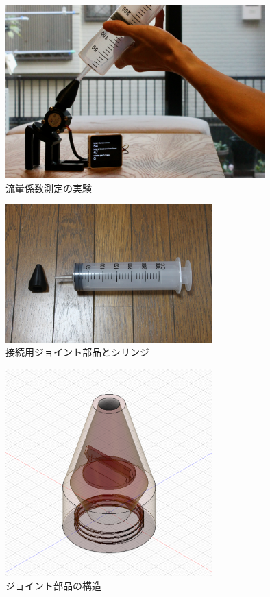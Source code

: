 \begin{figure}[H]
  \begin{center}
    \includegraphics[width=10cm]{fig/flowsensor_calibrate}
    \caption{流量係数測定の実験}
    \label{fig:flowsensor_calibrate}
  \end{center}
\end{figure}

\begin{figure}[H]
  \begin{center}
    \includegraphics[width=8cm]{fig/syringe}
    \caption{接続用ジョイント部品とシリンジ}
    \label{fig:syringe}
  \end{center}
\end{figure}

\begin{figure}[H]
  \begin{center}
    \includegraphics[width=8cm]{fig/syringe_cone}
    \caption{ジョイント部品の構造}
    \label{fig:syringe_cone}
  \end{center}
\end{figure}

